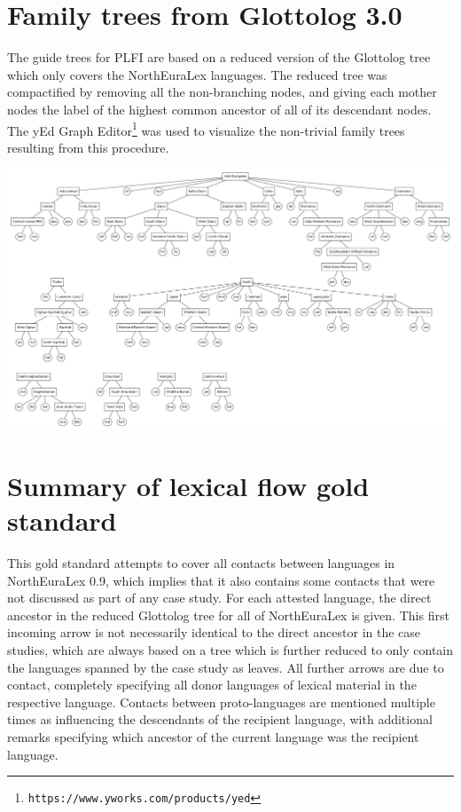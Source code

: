 \section{Family trees from Glottolog 3.0}
The guide trees for PLFI are based on a reduced version of the Glottolog tree which only covers the NorthEuraLex languages. The reduced tree was compactified by removing all the non-branching nodes, and giving each mother nodes the label of the highest common ancestor of all of its descendant nodes. The yEd Graph Editor\footnote{\texttt{https://www.yworks.com/products/yed}} was used to visualize the non-trivial family trees resulting from this procedure.

\begin{center}
 \includegraphics[width=\textwidth]{figures/glottolog-family-trees.png}
 \addtocounter{table}{-1} 
\end{center}

\newpage

\section{Summary of lexical flow gold standard}
This gold standard attempts to cover all contacts between languages in NorthEuraLex 0.9, which implies that it also contains some contacts that were not discussed as part of any case study. For each attested language, the direct ancestor in the reduced Glottolog tree for all of NorthEuraLex is given. This first incoming arrow is not necessarily identical to the direct ancestor in the case studies, which are always based on a tree which is further reduced to only contain the languages spanned by the case study as leaves. All further arrows are due to contact, completely specifying all donor languages of lexical material in the respective language. Contacts between proto-languages are mentioned multiple times as influencing the descendants of the recipient language, with additional remarks specifying which ancestor of the current language was the recipient language.


